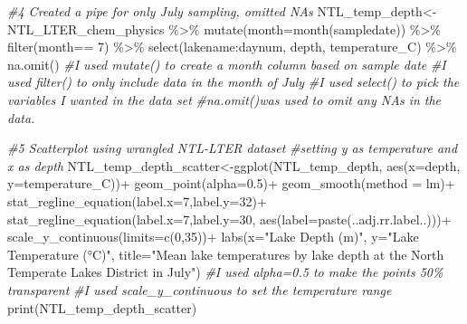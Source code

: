 \documentclass[
]{article}
\newenvironment{Shaded}{\begin{snugshade}}{\end{snugshade}}
\newcommand{\AttributeTok}[1]{\textcolor[rgb]{0.77,0.63,0.00}{#1}}
\newcommand{\CommentTok}[1]{\textcolor[rgb]{0.56,0.35,0.01}{\textit{#1}}}
\newcommand{\DecValTok}[1]{\textcolor[rgb]{0.00,0.00,0.81}{#1}}
\newcommand{\FloatTok}[1]{\textcolor[rgb]{0.00,0.00,0.81}{#1}}
\newcommand{\FunctionTok}[1]{\textcolor[rgb]{0.00,0.00,0.00}{#1}}
\newcommand{\NormalTok}[1]{#1}
\newcommand{\OtherTok}[1]{\textcolor[rgb]{0.56,0.35,0.01}{#1}}
\newcommand{\SpecialCharTok}[1]{\textcolor[rgb]{0.00,0.00,0.00}{#1}}
\newcommand{\StringTok}[1]{\textcolor[rgb]{0.31,0.60,0.02}{#1}}
\begin{document}
\begin{Shaded}
\begin{Highlighting}[]
\CommentTok{\#4 Created a pipe for only July sampling, omitted NAs  }
\NormalTok{NTL\_temp\_depth}\OtherTok{\textless{}{-}}\NormalTok{ NTL\_LTER\_chem\_physics }\SpecialCharTok{\%\textgreater{}\%}
                              \FunctionTok{mutate}\NormalTok{(}\AttributeTok{month=}\FunctionTok{month}\NormalTok{(sampledate)) }\SpecialCharTok{\%\textgreater{}\%} 
                              \FunctionTok{filter}\NormalTok{(month}\SpecialCharTok{==} \DecValTok{7}\NormalTok{) }\SpecialCharTok{\%\textgreater{}\%} 
                              \FunctionTok{select}\NormalTok{(lakename}\SpecialCharTok{:}\NormalTok{daynum, depth, temperature\_C) }\SpecialCharTok{\%\textgreater{}\%}
                              \FunctionTok{na.omit}\NormalTok{()}
\CommentTok{\#I used mutate() to create a month column based on sample date}
\CommentTok{\#I used filter() to only include data in the month of July}
\CommentTok{\#I used select() to pick the variables I wanted in the data set}
\CommentTok{\#na.omit()was used to omit any NAs in the data. }

\CommentTok{\#5 Scatterplot using wrangled NTL{-}LTER dataset }
\CommentTok{\#setting y as temperature and x as depth}
\NormalTok{NTL\_temp\_depth\_scatter}\OtherTok{\textless{}{-}}\FunctionTok{ggplot}\NormalTok{(NTL\_temp\_depth, }\FunctionTok{aes}\NormalTok{(}\AttributeTok{x=}\NormalTok{depth,}
                               \AttributeTok{y=}\NormalTok{temperature\_C))}\SpecialCharTok{+}
                               \FunctionTok{geom\_point}\NormalTok{(}\AttributeTok{alpha=}\FloatTok{0.5}\NormalTok{)}\SpecialCharTok{+}
                               \FunctionTok{geom\_smooth}\NormalTok{(}\AttributeTok{method =}\NormalTok{ lm)}\SpecialCharTok{+}
                               \FunctionTok{stat\_regline\_equation}\NormalTok{(}\AttributeTok{label.x=}\DecValTok{7}\NormalTok{,}\AttributeTok{label.y=}\DecValTok{32}\NormalTok{)}\SpecialCharTok{+}
                               \FunctionTok{stat\_regline\_equation}\NormalTok{(}\AttributeTok{label.x=}\DecValTok{7}\NormalTok{,}\AttributeTok{label.y=}\DecValTok{30}\NormalTok{,}
                                                     \FunctionTok{aes}\NormalTok{(}\AttributeTok{label=}\FunctionTok{paste}\NormalTok{(..adj.rr.label..)))}\SpecialCharTok{+}
                               \FunctionTok{scale\_y\_continuous}\NormalTok{(}\AttributeTok{limits=}\FunctionTok{c}\NormalTok{(}\DecValTok{0}\NormalTok{,}\DecValTok{35}\NormalTok{))}\SpecialCharTok{+}
                               \FunctionTok{labs}\NormalTok{(}\AttributeTok{x=}\StringTok{"Lake Depth (m)"}\NormalTok{, }
                                    \AttributeTok{y=}\StringTok{"Lake Temperature (°C)"}\NormalTok{,}
                                    \AttributeTok{title=}\StringTok{"Mean lake temperatures by lake depth at the North Temperate Lakes District in July"}\NormalTok{)}
\CommentTok{\#I used alpha=0.5 to make the points 50\% transparent}
\CommentTok{\#I used scale\_y\_continuous to set the temperature range}
\FunctionTok{print}\NormalTok{(NTL\_temp\_depth\_scatter)}
\end{Highlighting}
\end{Shaded}
\end{document}
